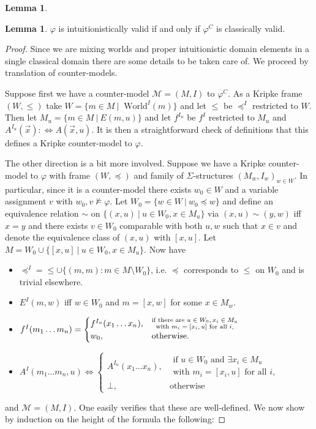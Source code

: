 \documentclass{easychair}
\theoremstyle{definition}
\theoremstyle{definition}
\theoremstyle{definition}
\newtheorem{lemma}[theorem]{Lemma}
\theoremstyle{definition}
\theoremstyle{definition}
\theoremstyle{definition}
\theoremstyle{definition}
\begin{document}
\begin{lemma}
\begin{lemma}\label{proof:fo-simplification}
	$\varphi$ is intuitionistically valid if and only if $\varphi^C$ is classically valid.
\end{lemma}

\begin{proof}
	Since we are mixing worlds and proper intuitionistic domain elements in a single classical domain there are some details to be taken care of. We proceed by translation of counter-models.
	
	Suppose first we have a counter-model $\mathcal M = (M, I)$ to $\varphi^C$. As a Kripke frame $(W, \leq)$ take $ W = \{m\in M\:|\:\text{ World}^I(m)\}$ and let $\leq$ be $\preceq^I$ restricted to $W$. Then let $M_u = \{m\in M\:|\: E(m, u)\}$ and let $f^{I_u}$ be $f^I$ restricted to $M_u$ and $A^{I_u}(\vec x): \Leftrightarrow A(\vec x, u)$. It is then a straightforward check of definitions that this defines a Kripke counter-model to $\varphi$.
	
	The other direction is a bit more involved. Suppose we have a Kripke counter-model to $\varphi$ with frame $(W, \preceq)$ and family of $\Sigma$-structures $(M_w, I_w)_{w\in W}$.
In particular, since it is a counter-model there exists $w_0\in W$ and a variable assignment $v$ with $w_0, v\not\models\varphi$.
Let $W_0 = \{w\in W\:|\: w_0\preceq w\}$ and define an equivalence relation $\sim$ on $\{(x, u)\:|\:u\in W_0, x\in M_u\}$ via $(x, u)\sim (y, w)$ iff $x = y$ and there exists $v\in W_0$ comparable with both $u, w$ such that $x\in v$ and denote the equivalence class of $(x, u)$ with $[x, u]$. Let $M = W_0\cup \{[x, u]\:|\:u\in W_0, x\in M_u\}$.
	Now have
	\begin{itemize}
		\item $\preceq^I = \leq\cup \{(m, m): m\in M\setminus W_0\}$, i.e. $\preceq$ corresponds to $\leq$ on $W_0$ and is trivial elsewhere.
		\item $E^I(m, w)$ iff $w\in W_0$ and $m = [x, w]$ for some $x\in M_w$.
		\item $f^I(m_1\dots m_n) =\begin{cases}
			f^{I_u}(x_1\dots x_n), &\substack{\text{if there are $ u\in W_0, x_i\in M_u$}\\ \text{with $m_i= [x_i, u]$ for all $i$,}}\\
			w_0, & \text{otherwise.}
		\end{cases}$
		\item ${A}^I(m_1\dots m_n, u) \Leftrightarrow\begin{cases}
			A^{I_u}(x_1\dots x_n), &\substack{\text{if $u\in W_0$ and $\exists x_i\in M_u$}\\\text{with $m_i= [x_i, u]$ for all $i$,}}\\
			\bot, & \text{otherwise}
		\end{cases}$
	\end{itemize}
	and $\mathcal M = (M, I)$. One easily verifies that these are well-defined. We now show by induction on the height of the formula the following:
	

\end{proof}
\end{lemma}
\end{document}
